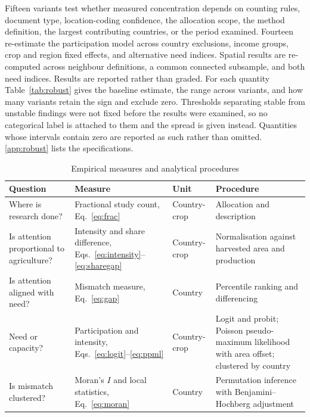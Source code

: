 \documentclass[ASNA,twocolumn]{USG}
\begin{document}
Fifteen variants test whether measured concentration depends on counting rules, document type,
location-coding confidence, the allocation scope, the method definition, the largest contributing
countries, or the period examined. Fourteen re-estimate the participation model across country
exclusions, income groups, crop and region fixed effects, and alternative need indices. Spatial
results are re-computed across neighbour definitions, a common connected subsample, and both need
indices. Results are reported rather than graded. For each quantity Table~\ref{tab:robust} gives the
baseline estimate, the range across variants, and how many variants retain the sign and exclude
zero. Thresholds separating stable from unstable findings were not fixed before the results were
examined, so no categorical label is attached to them and the spread is given instead. Quantities
whose intervals contain zero are reported as such rather than omitted.
\ref{app:robust} lists the specifications.

\begin{table}[!t]
\centering
\footnotesize
\setlength{\tabcolsep}{4pt}
\renewcommand{\arraystretch}{1.1}
\caption{Empirical measures and analytical procedures}
\label{tab:methods}
\begin{tabular}{@{}>{\raggedright\arraybackslash}p{3.6cm}
                  >{\raggedright\arraybackslash}p{4.3cm}
                  >{\raggedright\arraybackslash}p{1.9cm}
                  >{\raggedright\arraybackslash}p{4.7cm}@{}}
\toprule
Question & Measure & Unit & Procedure \\
\midrule
Where is research done? & Fractional study count, Eq.~\eqref{eq:frac} & Country-crop &
Allocation and description \\
Is attention proportional to agriculture? & Intensity and share difference,
Eqs.~\eqref{eq:intensity}--\eqref{eq:sharegap} & Country-crop &
Normalisation against harvested area and production \\
Is attention aligned with need? & Mismatch measure, Eq.~\eqref{eq:gap} & Country &
Percentile ranking and differencing \\
Need or capacity? & Participation and intensity,
Eqs.~\eqref{eq:logit}--\eqref{eq:ppml} & Country-crop &
Logit and probit; Poisson pseudo-maximum likelihood with area offset; clustered by country \\
Is mismatch clustered? & Moran's $I$ and local statistics, Eq.~\eqref{eq:moran} & Country &
Permutation inference with Benjamini--Hochberg adjustment \\
\bottomrule
\end{tabular}
\end{table}
\end{document}
